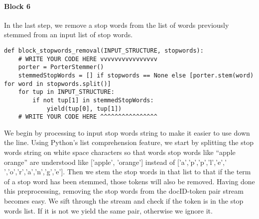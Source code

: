 \documentclass[]{report}
\begin{document}
\paragraph{Block 6}
In the last step, we remove a stop words from the list of words previously stemmed from an input list of stop words.
\begin{verbatim}
def block_stopwords_removal(INPUT_STRUCTURE, stopwords):
	# WRITE YOUR CODE HERE vvvvvvvvvvvvvvvv
	porter = PorterStemmer()
	stemmedStopWords = [] if stopwords == None else [porter.stem(word) for word in stopwords.split()]
	for tup in INPUT_STRUCTURE:
		if not tup[1] in stemmedStopWords:
			yield(tup[0], tup[1])
	# WRITE YOUR CODE HERE ^^^^^^^^^^^^^^^^
\end{verbatim}
We begin by processing to input stop words string to make it easier to use down the line. Using Python's list comprehension feature, we start by splitting the stop words string on white space characters so that words stop words like ``apple orange'' are understood like ['apple', 'orange'] instead of ['a','p','p','l','e',' ','o','r','a','n','g','e']. Then we stem the stop words in that list to that if the term of a stop word has been stemmed, those tokens will also be removed. Having done this preprocessing, removing the stop words from the docID-token pair stream becomes easy. We sift through the stream and check if the token is in the stop words list. If it is not we yield the same pair, otherwise we ignore it.
\end{document}
